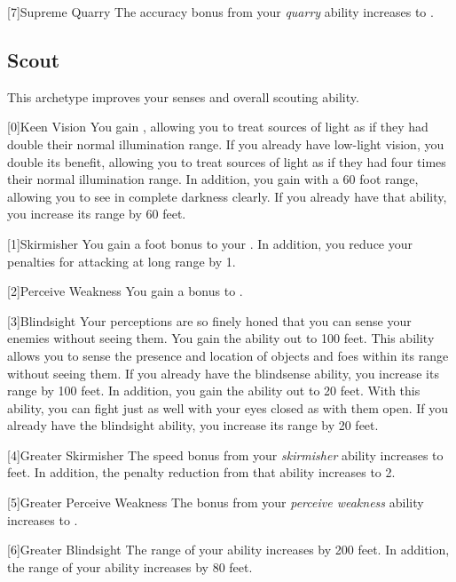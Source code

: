         [7]{Supreme Quarry} The accuracy bonus from your \textit{quarry} ability increases to .

    \newpage
    \subsection{Scout}
        This archetype improves your senses and overall scouting ability.

        [0]{Keen Vision}
        You gain , allowing you to treat sources of light as if they had double their normal illumination range.
        If you already have low-light vision, you double its benefit, allowing you to treat sources of light as if they had four times their normal illumination range.
        In addition, you gain  with a 60 foot range, allowing you to see in complete darkness clearly.
        If you already have that ability, you increase its range by 60 feet.

        [1]{Skirmisher} You gain a  foot bonus to your .
        In addition, you reduce your  penalties for attacking at long range by 1.

        [2]{Perceive Weakness} You gain a  bonus to .

        [3]{Blindsight} Your perceptions are so finely honed that you can sense your enemies without seeing them.
        You gain the  ability out to 100 feet.
        This ability allows you to sense the presence and location of objects and foes within its range without seeing them.
        If you already have the blindsense ability, you increase its range by 100 feet.
        In addition, you gain the  ability out to 20 feet.
        With this ability, you can fight just as well with your eyes closed as with them open.
        If you already have the blindsight ability, you increase its range by 20 feet.

        [4]{Greater Skirmisher} The speed bonus from your \textit{skirmisher} ability increases to  feet.
        In addition, the penalty reduction from that ability increases to 2.

        [5]{Greater Perceive Weakness} The bonus from your \textit{perceive weakness} ability increases to .

        [6]{Greater Blindsight} The range of your  ability increases by 200 feet.
        In addition, the range of your  ability increases by 80 feet.

